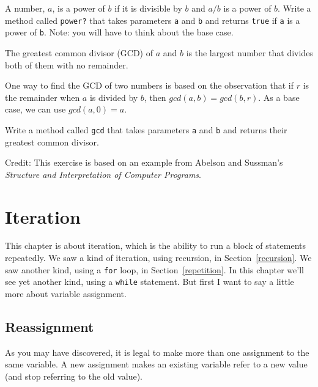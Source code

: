 \documentclass[10pt]{book}
\begin{document}
\begin{exercise}

A number, $a$, is a power of $b$ if it is divisible by $b$
and $a/b$ is a power of $b$.  Write a method called
\verb"power?" that takes parameters {\tt a} and {\tt b}
and returns {\tt true} if {\tt a} is a power of {\tt b}.
Note: you will have to think about the base case.

\end{exercise}


\begin{exercise}

The greatest common divisor (GCD) of $a$ and $b$ is the largest number
that divides both of them with no remainder.  

One way to find the GCD of two numbers is based on the observation
that if $r$ is the remainder when $a$ is divided by $b$, then $gcd(a,
b) = gcd(b, r)$.  As a base case, we can use $gcd(a, 0) = a$.

Write a method called
\verb"gcd" that takes parameters {\tt a} and {\tt b}
and returns their greatest common divisor.

Credit: This exercise is based on an example from Abelson and
Sussman's {\em Structure and Interpretation of Computer Programs}.

\end{exercise}


\chapter{Iteration}

This chapter is about iteration, which is the ability to run
a block of statements repeatedly.  We saw a kind of iteration,
using recursion, in Section~\ref{recursion}.
We saw another kind, using a {\tt for} loop,
in Section~\ref{repetition}.  In this chapter we'll see yet another
kind, using a {\tt while} statement.
But first I want to say a little more about variable assignment.


\section{Reassignment}

As you may have discovered, it is legal to make more than one
assignment to the same variable.  A new assignment makes an existing
variable refer to a new value (and stop referring to the old value).
\end{document}
